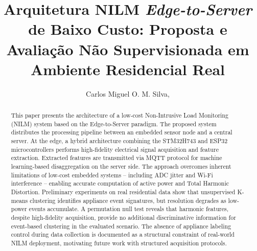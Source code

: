 \documentclass[12pt]{article}
\title{Arquitetura NILM \textit{Edge-to-Server} de Baixo Custo: Proposta e Avalia\c{c}\~ao N\~ao Supervisionada em Ambiente Residencial Real}
\author{
  Carlos Miguel O. M. Silva\inst{1},
}
\begin{document}
\maketitle

\begin{abstract}
  This paper presents the architecture of a low-cost Non-Intrusive Load
  Monitoring (NILM) system based on the Edge-to-Server paradigm. The proposed
  system distributes the processing pipeline between an embedded sensor node
  and a central server. At the edge, a hybrid architecture combining the
  STM32H743 and ESP32 microcontrollers performs high-fidelity electrical
  signal acquisition and feature extraction. Extracted features are transmitted
  via MQTT protocol for machine learning-based disaggregation on the server
  side. The approach overcomes inherent limitations of low-cost embedded
  systems -- including ADC jitter and Wi-Fi interference -- enabling accurate
  computation of active power and Total Harmonic Distortion.
  Preliminary experiments on real residential data show that unsupervised
  K-means clustering identifies appliance event signatures, but resolution
  degrades as low-power events accumulate. A permutation null test reveals that
  harmonic features, despite high-fidelity acquisition, provide no additional
  discriminative information for event-based clustering in the evaluated
  scenario. The absence of appliance labeling control during data collection
  is documented as a structural constraint of real-world NILM deployment,
  motivating future work with structured acquisition protocols.
\end{abstract}
\end{document}
